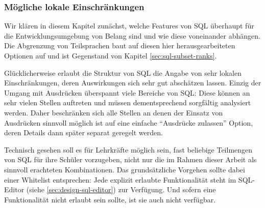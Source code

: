 \subsubsection{Mögliche lokale Einschränkungen}
\label{sec:sql-subset-local}


Wir klären in diesem Kapitel zunächst, welche Features von SQL überhaupt für die Entwicklungsumgebung von Belang sind und wie diese voneinander abhängen. Die Abgrenzung von Teilsprachen baut auf diesen hier herausgearbeiteten Optionen auf und ist Gegenstand von Kapitel \ref{sec:sql-subset-ranks}.

Glücklicherweise erlaubt die Struktur von SQL die Angabe von sehr lokalen Einschränkungen, deren Auswirkungen sich sehr gut abschätzen lassen. Einzig der Umgang mit Ausdrücken überspannt viele Bereiche von SQL: Diese können an sehr vielen Stellen auftreten und müssen dementsprechend sorgfältig analysiert werden. Daher beschränken sich alle Stellen an denen der Einsatz von Ausdrücken sinnvoll möglich ist auf eine einfache ``Ausdrücke zulassen'' Option, deren Details dann später separat geregelt werden.


Technisch gesehen soll es für Lehrkräfte möglich sein, fast beliebige Teilmengen von SQL für ihre Schüler vorzugeben, nicht nur die im Rahmen dieser Arbeit als sinnvoll erachteten Kombinationen. Das grundsätzliche Vorgehen sollte dabei einer Whitelist entsprechen: Jede explizit erlaubte Funktionalität steht im SQL-Editor (siehe \ref{sec:design-sql-editor}) zur Verfügung. Und sofern eine Funktionalität nicht erlaubt sein sollte, ist sie auch nicht verfügbar.

